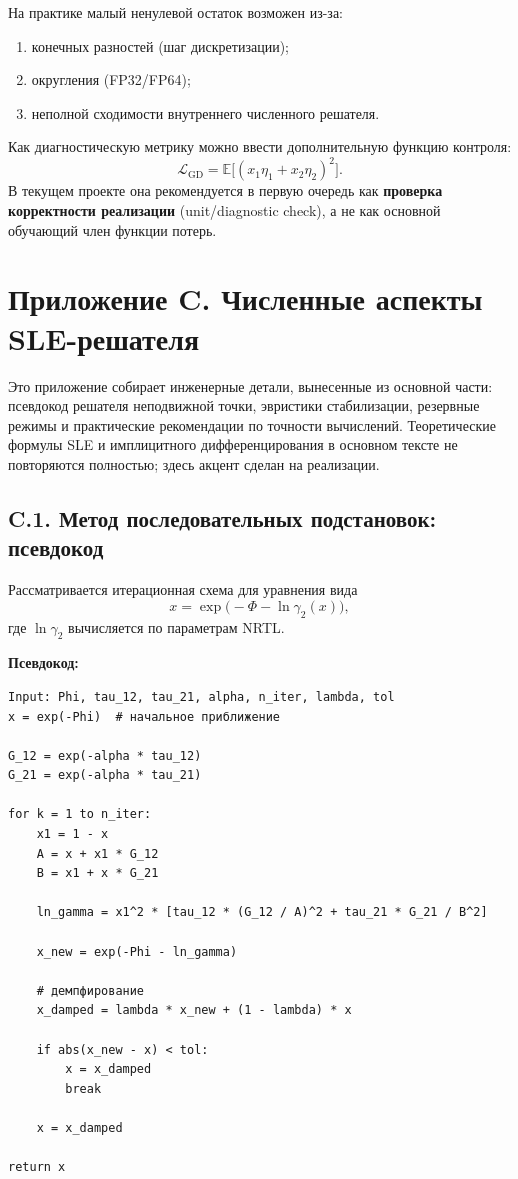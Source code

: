 \documentclass[11pt]{article}
\begin{document}
На практике малый ненулевой остаток возможен из-за:
\begin{enumerate}
  \item конечных разностей (шаг дискретизации);
  \item округления (FP32/FP64);
  \item неполной сходимости внутреннего численного решателя.
\end{enumerate}

Как диагностическую метрику можно ввести дополнительную функцию контроля:
\begin{equation*}
\mathcal{L}_{\mathrm{GD}}=\mathbb{E}\bigl[(x_1\eta_1+x_2\eta_2)^2\bigr].
\end{equation*}
В текущем проекте она рекомендуется в первую очередь как \textbf{проверка корректности реализации} (unit/diagnostic check), а не как основной обучающий член функции потерь.




\section*{Приложение C. Численные аспекты SLE-решателя}

Это приложение собирает инженерные детали, вынесенные из основной части: псевдокод решателя неподвижной точки, эвристики стабилизации, резервные режимы и практические рекомендации по точности вычислений. Теоретические формулы SLE и имплицитного дифференцирования в основном тексте не повторяются полностью; здесь акцент сделан на реализации.

\subsection*{C.1. Метод последовательных подстановок: псевдокод}

Рассматривается итерационная схема для уравнения вида
\begin{equation*}
x = \exp\!\bigl(-\Phi - \ln\gamma_2(x)\bigr),
\end{equation*}
где $\ln\gamma_2$ вычисляется по параметрам NRTL.

\noindent\textbf{Псевдокод:}
\begin{verbatim}
Input: Phi, tau_12, tau_21, alpha, n_iter, lambda, tol
x = exp(-Phi)  # начальное приближение

G_12 = exp(-alpha * tau_12)
G_21 = exp(-alpha * tau_21)

for k = 1 to n_iter:
    x1 = 1 - x
    A = x + x1 * G_12
    B = x1 + x * G_21

    ln_gamma = x1^2 * [tau_12 * (G_12 / A)^2 + tau_21 * G_21 / B^2]

    x_new = exp(-Phi - ln_gamma)

    # демпфирование
    x_damped = lambda * x_new + (1 - lambda) * x

    if abs(x_new - x) < tol:
        x = x_damped
        break

    x = x_damped

return x
\end{verbatim}
\end{document}
